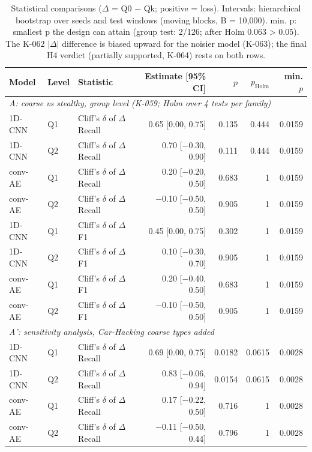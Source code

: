 \begin{table}[t]
\centering
\footnotesize
\caption{Statistical comparisons ($\Delta$ = Q0 $-$ Qk; positive = loss). Intervals: hierarchical bootstrap over seeds and test windows (moving blocks, B = 10,000). min. p: smallest p the design can attain (group test: 2/126; after Holm 0.063 > 0.05). The K-062 $|\Delta|$ difference is biased upward for the noisier model (K-063); the final H4 verdict (partially supported, K-064) rests on both rows.}
\label{tab:stats}
\begin{tabular}{@{}lllrrrr@{}}
\toprule
Model & Level & Statistic & Estimate [95\% CI] & $p$ & $p_\mathrm{Holm}$ & min. $p$ \\
\midrule
\multicolumn{7}{l}{\textit{A: coarse vs stealthy, group level (K-059; Holm over 4 tests per family)}} \\
1D-CNN & Q1 & Cliff's $\delta$ of $\Delta$Recall & 0.65 [0.00, 0.75] & 0.135 & 0.444 & 0.0159 \\
1D-CNN & Q2 & Cliff's $\delta$ of $\Delta$Recall & 0.70 [$-$0.30, 0.90] & 0.111 & 0.444 & 0.0159 \\
conv-AE & Q1 & Cliff's $\delta$ of $\Delta$Recall & 0.20 [$-$0.20, 0.50] & 0.683 & 1 & 0.0159 \\
conv-AE & Q2 & Cliff's $\delta$ of $\Delta$Recall & $-$0.10 [$-$0.50, 0.50] & 0.905 & 1 & 0.0159 \\
1D-CNN & Q1 & Cliff's $\delta$ of $\Delta$F1 & 0.45 [0.00, 0.75] & 0.302 & 1 & 0.0159 \\
1D-CNN & Q2 & Cliff's $\delta$ of $\Delta$F1 & 0.10 [$-$0.30, 0.70] & 0.905 & 1 & 0.0159 \\
conv-AE & Q1 & Cliff's $\delta$ of $\Delta$F1 & 0.20 [$-$0.40, 0.50] & 0.683 & 1 & 0.0159 \\
conv-AE & Q2 & Cliff's $\delta$ of $\Delta$F1 & $-$0.10 [$-$0.50, 0.50] & 0.905 & 1 & 0.0159 \\
\midrule
\multicolumn{7}{l}{\textit{A': sensitivity analysis, Car-Hacking coarse types added}} \\
1D-CNN & Q1 & Cliff's $\delta$ of $\Delta$Recall & 0.69 [0.00, 0.75] & 0.0182 & 0.0615 & 0.0028 \\
1D-CNN & Q2 & Cliff's $\delta$ of $\Delta$Recall & 0.83 [$-$0.06, 0.94] & 0.0154 & 0.0615 & 0.0028 \\
conv-AE & Q1 & Cliff's $\delta$ of $\Delta$Recall & 0.17 [$-$0.22, 0.50] & 0.716 & 1 & 0.0028 \\
conv-AE & Q2 & Cliff's $\delta$ of $\Delta$Recall & $-$0.11 [$-$0.50, 0.44] & 0.796 & 1 & 0.0028 \\

\end{tabular}
\end{table}

